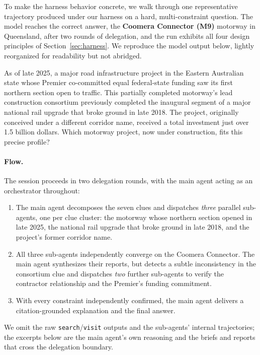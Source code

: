 \documentclass[table]{gtech}
\begin{document}
To make the harness behavior concrete, we walk through one representative trajectory produced under our harness on a hard, multi-constraint question. The model reaches the correct answer, the \textbf{Coomera Connector (M9)} motorway in Queensland, after two rounds of delegation, and the run exhibits all four design principles of Section~\ref{sec:harness}. We reproduce the model output below, lightly reorganized for readability but not abridged.

\begin{tcolorbox}[breakable,enhanced jigsaw,colback=blue!4,colframe=blue!55,boxrule=0.4pt,left=5pt,right=5pt,top=3pt,bottom=3pt,fonttitle=\bfseries\sffamily\small,coltitle=black,fontupper=\small,title={User question}]
As of late 2025, a major road infrastructure project in the Eastern Australian state whose Premier co-committed equal federal-state funding saw its first northern section open to traffic. This partially completed motorway's lead construction consortium previously completed the inaugural segment of a major national rail upgrade that broke ground in late 2018. The project, originally conceived under a different corridor name, received a total investment just over 1.5 billion dollars. Which motorway project, now under construction, fits this precise profile?
\end{tcolorbox}

\paragraph{Flow.} The session proceeds in two delegation rounds, with the main agent acting as an orchestrator throughout:
\begin{enumerate}[leftmargin=1.4em,topsep=2pt,itemsep=2pt]
\item The main agent decomposes the seven clues and dispatches \emph{three} parallel sub-agents, one per clue cluster: the motorway whose northern section opened in late 2025, the national rail upgrade that broke ground in late 2018, and the project's former corridor name.
\item All three sub-agents independently converge on the Coomera Connector. The main agent synthesizes their reports, but detects a subtle inconsistency in the consortium clue and dispatches \emph{two} further sub-agents to verify the contractor relationship and the Premier's funding commitment.
\item With every constraint independently confirmed, the main agent delivers a citation-grounded explanation and the final answer.
\end{enumerate}
We omit the raw \texttt{search}/\texttt{visit} outputs and the sub-agents' internal trajectories; the excerpts below are the main agent's own reasoning and the briefs and reports that cross the delegation boundary.
\end{document}

